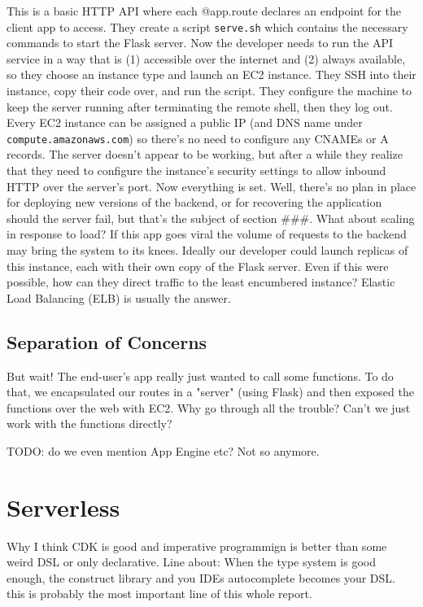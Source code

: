 \documentclass{article}
\newcommand{\newp}{\newline\indent}
\begin{document}
This is a basic HTTP API where each @app.route declares an endpoint for the client app to access.
They create a script \texttt{serve.sh} which contains the necessary commands to start the Flask server.
Now the developer needs to run the API service in a way that is (1) accessible over the internet and (2) always available, so they choose an instance type and launch an EC2 instance.
They SSH into their instance, copy their code over, and run the script.
They configure the machine to keep the server running after terminating the remote shell, then they log out.
Every EC2 instance can be assigned a public IP (and DNS name under \texttt{compute.amazonaws.com}) so there's no need to configure any CNAMEs or A records.
The server doesn't appear to be working, but after a while they realize that they need to configure the instance's security settings to allow inbound HTTP over the server's port.
Now everything is set.
\newp Well, there's no plan in place for deploying new versions of the backend, or for recovering the application should the server fail, but that's the subject of section \#\#\#.
\newp What about scaling in response to load?
If this app goes viral the volume of requests to the backend may bring the system to its knees.
Ideally our developer could launch replicas of this instance, each with their own copy of the Flask server.
Even if this were possible, how can they direct traffic to the least encumbered instance?
Elastic Load Balancing (ELB) is usually the answer.

\subsection {Separation of Concerns}

But wait!
The end-user's app really just wanted to call some functions.
To do that, we encapsulated our routes in a "server" (using Flask) and then exposed the functions over the web with EC2.
Why go through all the trouble?
Can't we just work with the functions directly?

TODO: do we even mention App Engine etc?
\newp Not so anymore.


\section{Serverless}

Why I think CDK is good and imperative programmign is better than some weird DSL or only declarative.
Line about:
When the type system is good enough, the construct library and you IDEs autocomplete becomes your DSL.
this is probably the most important line of this whole report.
\end{document}
